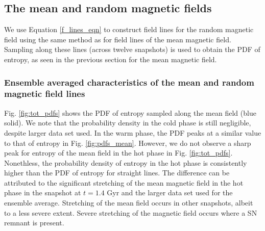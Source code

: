 \documentclass[useAMS,usenatbib]{mn2e}
\begin{document}
\subsection{The mean and random magnetic fields}
We use Equation \eqref{f_lines_eqn} to construct field lines for the random magnetic field using the same method as for field lines of the mean magnetic field. Sampling along these lines (across twelve snapshots) is used to obtain the PDF of entropy, as seen in the previous section for the mean magnetic field. 
\subsubsection{Ensemble averaged characteristics of the mean and random magnetic field lines }
Fig. \ref{fig:tot_pdfs} shows the PDF of entropy sampled along the mean field (blue solid). We note that the probability density in the cold phase is still negligible, despite larger data set used. In the warm phase, the PDF peaks at a similar value to that of entropy in Fig. \ref{fig:pdfs_mean}. However, we do not observe a sharp peak for entropy of the mean field in the hot phase in Fig. \ref{fig:tot_pdfs}. Nonethless, the probability density of entropy in the hot phase is consistently higher than the PDF of entropy for straight lines. The difference can be attributed to the significant stretching of the mean magnetic field in the hot phase in the snapshot at $t=1.4$ Gyr and the larger data set used for the ensemble average. Stretching of the mean field occurs in other snapshots, albeit to a less severe extent. Severe stretching of the magnetic field occurs where a SN remnant is present. 
\end{document}
